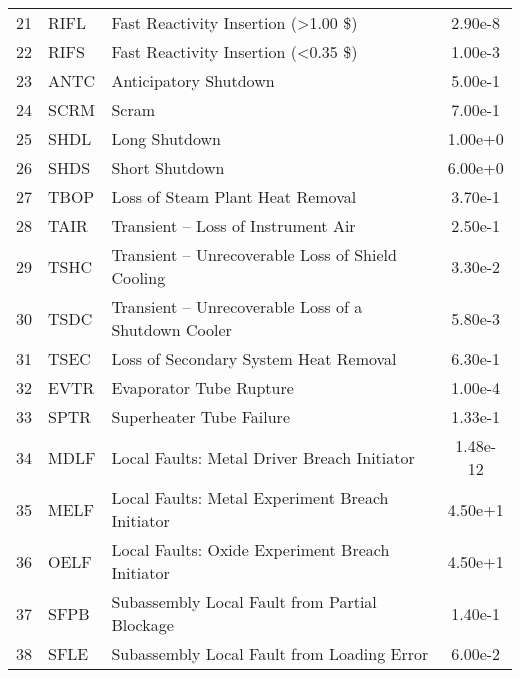 \begin{longtable}{@{}c l l S@{}}
21 & RIFL  & Fast Reactivity Insertion (>1.00 \$)                           & 2.90e-8  \\
22 & RIFS  & Fast Reactivity Insertion (<0.35 \$)                           & 1.00e-3  \\
23 & ANTC  & Anticipatory Shutdown                                          & 5.00e-1  \\
24 & SCRM  & Scram                                                          & 7.00e-1  \\
25 & SHDL  & Long Shutdown                                                  & 1.00e+0  \\
26 & SHDS  & Short Shutdown                                                 & 6.00e+0  \\
27 & TBOP  & Loss of Steam Plant Heat Removal                               & 3.70e-1  \\
28 & TAIR  & Transient -- Loss of Instrument Air                            & 2.50e-1  \\
29 & TSHC  & Transient -- Unrecoverable Loss of Shield Cooling              & 3.30e-2  \\
30 & TSDC  & Transient -- Unrecoverable Loss of a Shutdown Cooler           & 5.80e-3  \\
31 & TSEC  & Loss of Secondary System Heat Removal                          & 6.30e-1  \\
32 & EVTR  & Evaporator Tube Rupture                                        & 1.00e-4  \\
33 & SPTR  & Superheater Tube Failure                                       & 1.33e-1  \\
34 & MDLF  & Local Faults: Metal Driver Breach Initiator                    & 1.48e-12 \\
35 & MELF  & Local Faults: Metal Experiment Breach Initiator                & 4.50e+1  \\
36 & OELF  & Local Faults: Oxide Experiment Breach Initiator                & 4.50e+1  \\
37 & SFPB  & Subassembly Local Fault from Partial Blockage                  & 1.40e-1  \\
38 & SFLE  & Subassembly Local Fault from Loading Error                    & 6.00e-2  \\

\end{longtable}